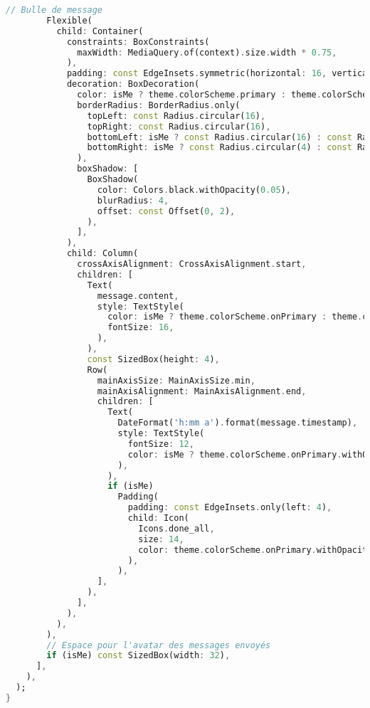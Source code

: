 \begin{lstlisting}[language=Dart, caption=Implémentation des bulles de messages, style=dartstyle]
        // Bulle de message
        Flexible(
          child: Container(
            constraints: BoxConstraints(
              maxWidth: MediaQuery.of(context).size.width * 0.75,
            ),
            padding: const EdgeInsets.symmetric(horizontal: 16, vertical: 10),
            decoration: BoxDecoration(
              color: isMe ? theme.colorScheme.primary : theme.colorScheme.surface,
              borderRadius: BorderRadius.only(
                topLeft: const Radius.circular(16),
                topRight: const Radius.circular(16),
                bottomLeft: isMe ? const Radius.circular(16) : const Radius.circular(4),
                bottomRight: isMe ? const Radius.circular(4) : const Radius.circular(16),
              ),
              boxShadow: [
                BoxShadow(
                  color: Colors.black.withOpacity(0.05),
                  blurRadius: 4,
                  offset: const Offset(0, 2),
                ),
              ],
            ),
            child: Column(
              crossAxisAlignment: CrossAxisAlignment.start,
              children: [
                Text(
                  message.content,
                  style: TextStyle(
                    color: isMe ? theme.colorScheme.onPrimary : theme.colorScheme.onSurface,
                    fontSize: 16,
                  ),
                ),
                const SizedBox(height: 4),
                Row(
                  mainAxisSize: MainAxisSize.min,
                  mainAxisAlignment: MainAxisAlignment.end,
                  children: [
                    Text(
                      DateFormat('h:mm a').format(message.timestamp),
                      style: TextStyle(
                        fontSize: 12,
                        color: isMe ? theme.colorScheme.onPrimary.withOpacity(0.7) : theme.colorScheme.onSurface.withOpacity(0.6),
                      ),
                    ),
                    if (isMe)
                      Padding(
                        padding: const EdgeInsets.only(left: 4),
                        child: Icon(
                          Icons.done_all,
                          size: 14,
                          color: theme.colorScheme.onPrimary.withOpacity(0.7),
                        ),
                      ),
                  ],
                ),
              ],
            ),
          ),
        ),
        // Espace pour l'avatar des messages envoyés
        if (isMe) const SizedBox(width: 32),
      ],
    ),
  );
}
\end{lstlisting}
